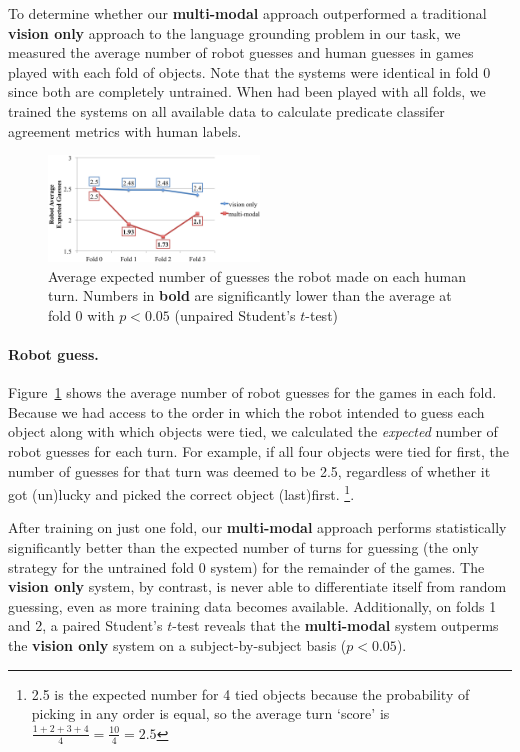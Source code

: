 To determine whether our \textbf{multi-modal} approach outperformed a traditional \textbf{vision only} approach to the language grounding problem in our \ispy task, we measured the average number of robot guesses and human guesses in games played with each fold of objects.
Note that the systems were identical in fold 0 since both are completely untrained.
When \ispy had been played with all folds, we trained the systems on all available data to calculate predicate classifer agreement metrics with human labels.

\begin{figure}
\centering
\includegraphics[width=0.5\textwidth]{figures/robot_guesses.png}
\caption{Average expected number of guesses the robot made on each human turn. Numbers in \textbf{bold} are significantly lower than the average at fold 0 with $p<0.05$ (unpaired Student's $t$-test)}
\label{fig:robot_guesses}
\end{figure}

\paragraph{Robot guess.}
Figure~\ref{fig:robot_guesses} shows the average number of robot guesses for the games in each fold. Because we had access to the order in which the robot intended to guess each object along with which objects were tied, we calculated the {\it expected} number of robot guesses for each turn.
For example, if all four objects were tied for first, the number of guesses for that turn was deemed to be 2.5, regardless of whether it got (un)lucky and picked the correct object (last)first.
\footnote{2.5 is the expected number for 4 tied objects because the probability of picking in any order is equal, so the average turn `score' is $\frac{1+2+3+4}{4} = \frac{10}{4} = 2.5$}.

After training on just one fold, our \textbf{multi-modal} approach performs statistically significantly better than the expected number of turns for guessing (the only strategy for the untrained fold 0 system) for the remainder of the games.
The \textbf{vision only} system, by contrast, is never able to differentiate itself from random guessing, even as more training data becomes available.
Additionally, on folds 1 and 2, a paired Student's $t$-test reveals that the \textbf{multi-modal} system outperms the \textbf{vision only} system on a subject-by-subject basis ($p<0.05$).

